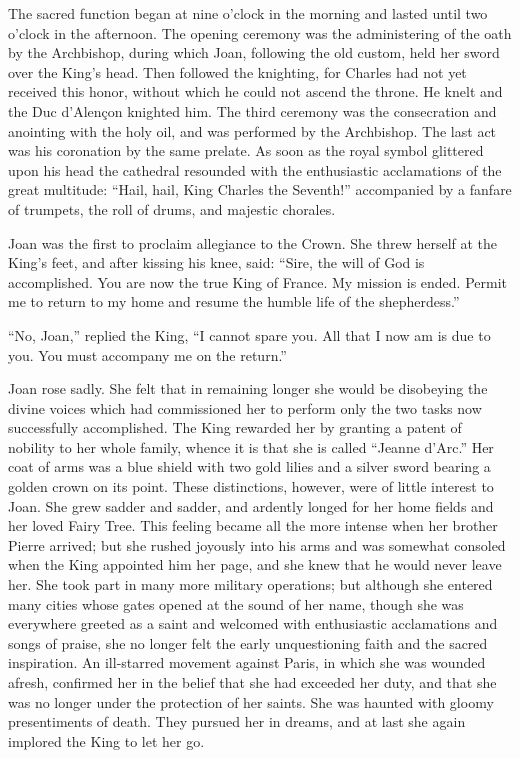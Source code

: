 The sacred function began at nine o'clock in the morning and lasted
until two o'clock in the afternoon. The opening ceremony was the
administering of the oath by the Archbishop, during which Joan,
following the old custom, held her sword over the King's head. Then
followed the knighting, for Charles had not yet received this honor,
without which he could not ascend the throne. He knelt and the Duc
d'Alençon knighted him. The third ceremony was the consecration and
anointing with the holy oil, and was performed by the Archbishop. The
last act was his coronation by the same prelate. As soon as the royal
symbol glittered upon his head the cathedral resounded with the
enthusiastic acclamations of the great multitude: ``Hail, hail, King
Charles the Seventh!'' accompanied by a fanfare of trumpets, the roll of
drums, and majestic chorales.

Joan was the first to proclaim allegiance to the Crown. She threw
herself at the King's feet, and after kissing his knee, said: ``Sire,
the will of God is accomplished. You are now the true King of France. My
mission is ended. Permit me to return to my home and resume the humble
life of the shepherdess.''

``No, Joan,'' replied the King, ``I cannot spare you. All that I now am
is due to you. You must accompany me on the return.''

Joan rose sadly. She felt that in remaining longer she would be
disobeying the divine voices which had commissioned her to perform only
the two tasks now successfully accomplished. The King rewarded her by
granting a patent of nobility to her whole family, whence it is that she
is called ``Jeanne d'Arc.'' Her coat of arms was a blue shield with two
gold lilies and a silver sword bearing a golden crown on its point.
These distinctions, however, were of little interest to Joan. She grew
sadder and sadder, and ardently longed for her home fields and her loved
Fairy Tree. This feeling became all the more intense when her brother
Pierre arrived; but she rushed joyously into his arms and was somewhat
consoled when the King appointed him her page, and she knew that he
would never leave her. She took part in many more military operations;
but although she entered many cities whose gates opened at the sound of
her name, though she was everywhere greeted as a saint and welcomed with
enthusiastic acclamations and songs of praise, she no longer felt the
early unquestioning faith and the sacred inspiration. An ill-starred
movement against Paris, in which she was wounded afresh, confirmed her
in the belief that she had exceeded her duty, and that she was no longer
under the protection of her saints. She was haunted with gloomy
presentiments of death. They pursued her in dreams, and at last she
again implored the King to let her go.

